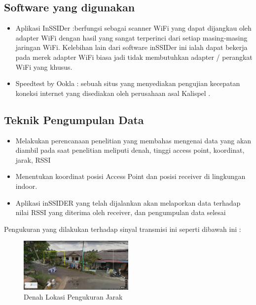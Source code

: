 \documentclass[conference]{IEEEtran}
\begin{document}
\subsection{Software yang digunakan}

\begin{itemize}
    \item Aplikasi InSSIDer :berfungsi sebagai scanner WiFi yang dapat dijangkau oleh adapter WiFi dengan hasil yang sangat terperinci dari setiap masing-masing jaringan WiFi. Kelebihan lain dari software inSSIDer ini ialah dapat bekerja pada merek adapter WiFi biasa jadi tidak membutuhkan adapter / perangkat WiFi yang khusus.
    \item Speedtest by Ookla : sebuah situs yang menyediakan pengujian kecepatan koneksi internet yang disediakan oleh perusahaan asal Kalispel .
\end{itemize}

\subsection{Teknik Pengumpulan Data}

\begin{itemize}
    \item Melakukan perencanaan penelitian yang membahas mengenai data yang akan diambil
pada saat penelitian meliputi denah, tinggi
access point, koordinat, jarak, RSSI 

    \item Menentukan koordinat posisi Access Point
dan posisi receiver di lingkungan indoor.

    \item Aplikasi inSSIDER yang telah dijalankan
akan melaporkan data terhadap nilai RSSI
yang diterima oleh receiver, dan
pengumpulan data selesai
\end{itemize}

Pengukuran yang dilakukan terhadap sinyal transmisi ini seperti dibawah ini :

\begin{figure}[h]
    \centering
    \includegraphics[width=0.5\textwidth]{gambar-lokasi.png}
    \caption{Denah Lokasi Pengukuran Jarak}
\end{figure}
\end{document}

